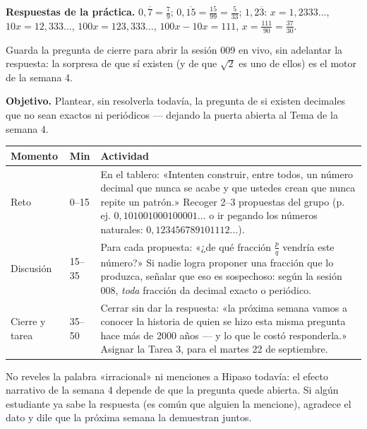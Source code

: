 \documentclass[11pt]{article}
\begin{document}
\textbf{Respuestas de la práctica.} $0{,}\overline{7} = \frac{7}{9}$;
$0{,}\overline{15} = \frac{15}{99} = \frac{5}{33}$; $1{,}2\overline{3}$: $x = 1{,}2333\ldots$,
$10x = 12{,}333\ldots$, $100x = 123{,}333\ldots$, $100x - 10x = 111$, $x = \frac{111}{90} =
\frac{37}{30}$.

\begin{nota}
Guarda la pregunta de cierre para abrir la sesión 009 en vivo, sin adelantar la respuesta:
la sorpresa de que sí existen (y de que $\sqrt{2}$ es uno de ellos) es el motor de la
semana 4.
\end{nota}


\textbf{Objetivo.} Plantear, sin resolverla todavía, la pregunta de si existen decimales
que no sean exactos ni periódicos — dejando la puerta abierta al Tema de la semana 4.

\begin{center}
{\renewcommand{\arraystretch}{1.3}
\begin{tabularx}{\linewidth}{@{}l l X@{}}
  \toprule
  \textbf{Momento} & \textbf{Min} & \textbf{Actividad}\\
  \midrule
  Reto & 0–15 & En el tablero: «Intenten construir, entre todos, un número decimal que
    nunca se acabe y que ustedes crean que nunca repite un patrón.» Recoger 2–3 propuestas
    del grupo (p. ej. $0{,}101001000100001\ldots$ o ir pegando los números naturales:
    $0{,}123456789101112\ldots$).\\
  Discusión & 15–35 & Para cada propuesta: «¿de qué fracción $\frac{p}{q}$ vendría este
    número?» Si nadie logra proponer una fracción que lo produzca, señalar que eso es
    sospechoso: según la sesión 008, \emph{toda} fracción da decimal exacto o periódico.\\
  Cierre y tarea & 35–50 & Cerrar sin dar la respuesta: «la próxima semana vamos a conocer
    la historia de quien se hizo esta misma pregunta hace más de 2000 años — y lo que le
    costó responderla.» Asignar la Tarea 3, para el martes 22 de septiembre.\\
  \bottomrule
\end{tabularx}}
\end{center}

\begin{nota}
No reveles la palabra «irracional» ni menciones a Hipaso todavía: el efecto narrativo de la
semana 4 depende de que la pregunta quede abierta. Si algún estudiante ya sabe la respuesta
(es común que alguien la mencione), agradece el dato y dile que la próxima semana la
demuestran juntos.
\end{nota}
\end{document}
